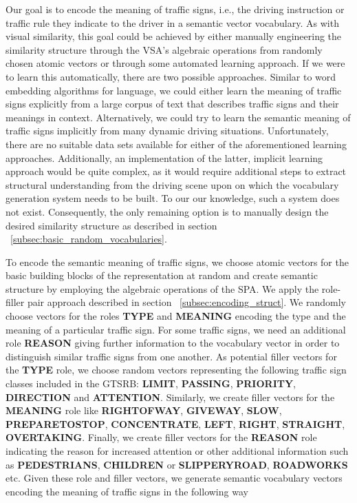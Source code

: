 Our goal is to encode the meaning of traffic signs, i.e., the driving instruction or traffic rule they indicate to the driver in a semantic vector vocabulary.
As with visual similarity, this goal could be achieved by either manually engineering the similarity structure through the \ac{VSA}'s algebraic operations from randomly chosen atomic vectors or through some automated learning approach.
If we were to learn this automatically, there are two possible approaches. 
Similar to word embedding algorithms for language, we could either learn the meaning of traffic signs explicitly from a large  corpus of text that describes traffic signs and their meanings in context.
Alternatively, we could try to learn the semantic meaning of traffic signs implicitly from many dynamic driving situations.
Unfortunately, there are no suitable data sets available for either of the aforementioned learning approaches.
Additionally, an implementation of the latter, implicit learning approach would be quite complex, as it would require additional steps to extract structural understanding from the driving scene upon on which the vocabulary generation system needs to be built.
To our our knowledge, such a system does not exist.
Consequently, the only remaining option is to manually design the desired similarity structure as described in section ~\ref{subsec:basic_random_vocabularies}.

To encode the semantic meaning of traffic signs, we choose atomic vectors for the basic building blocks of the representation at random and create semantic structure by employing the algebraic operations of the \ac{SPA}.
We apply the role-filler pair approach described in section ~\ref{subsec:encoding_struct}.
We randomly choose vectors for the roles \textbf{TYPE} and \textbf{MEANING} encoding the type and the meaning of a particular traffic sign.
For some traffic signs, we need an additional role \textbf{REASON} giving further information to the vocabulary vector in order to distinguish similar traffic signs from one another.
As potential filler vectors for the \textbf{TYPE} role, we choose random vectors representing the following traffic sign classes included in the \ac{GTSRB}: \textbf{LIMIT}, \textbf{PASSING}, \textbf{PRIORITY}, \textbf{DIRECTION} and \textbf{ATTENTION}.
Similarly, we create filler vectors for the \textbf{MEANING} role like \textbf{RIGHTOFWAY}, \textbf{GIVEWAY}, \textbf{SLOW}, \textbf{PREPARETOSTOP}, \textbf{CONCENTRATE}, \textbf{LEFT}, \textbf{RIGHT}, \textbf{STRAIGHT}, \textbf{OVERTAKING}.
Finally, we create filler vectors for the \textbf{REASON} role indicating the reason for increased attention or other additional information such as \textbf{PEDESTRIANS}, \textbf{CHILDREN} or \textbf{SLIPPERYROAD}, \textbf{ROADWORKS} etc.
Given these role and filler vectors, we generate semantic vocabulary vectors encoding the meaning of traffic signs in the following way

